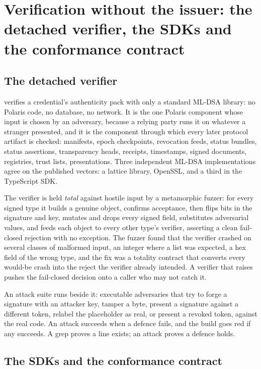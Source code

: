 \section{Verification without the issuer: the detached verifier, the SDKs and the conformance contract}
\label{sec:verifiers}

\subsection{The detached verifier}

 verifies a credential's authenticity pack with only a standard
ML-DSA library: no Polaris code, no database, no network. It is the one Polaris component whose
input is chosen by an adversary, because a relying party runs it on whatever a stranger presented,
and it is the component through which every later protocol artifact is checked: manifests, epoch
checkpoints, revocation feeds, status bundles, status assertions, transparency heads, receipts,
timestamps, signed documents, registries, trust lists, presentations. Three independent ML-DSA
implementations agree on the published vectors: a lattice library, OpenSSL, and a third in the
TypeScript SDK. \sImpl

The verifier is held \emph{total} against hostile input by a metamorphic fuzzer: for every signed
type it builds a genuine object, confirms acceptance, then flips bits in the signature and key,
mutates and drops every signed field, substitutes adversarial values, and feeds each object to every
other type's verifier, asserting a clean fail-closed rejection with no exception. The fuzzer found
that the verifier crashed on several classes of malformed input, an integer where a list was
expected, a hex field of the wrong type, and the fix was a totality contract that converts every
would-be crash into the reject the verifier already intended. A verifier that raises pushes the
fail-closed decision onto a caller who may not catch it. \sImpl

An attack suite runs beside it: executable adversaries that try to forge a signature with an
attacker key, tamper a byte, present a signature against a different token, relabel the placeholder
as real, or present a revoked token, against the real code. An attack succeeds when a defence fails,
and the build goes red if any succeeds. A grep proves a line exists; an attack proves a defence holds.
\sImpl

\subsection{The SDKs and the conformance contract}

